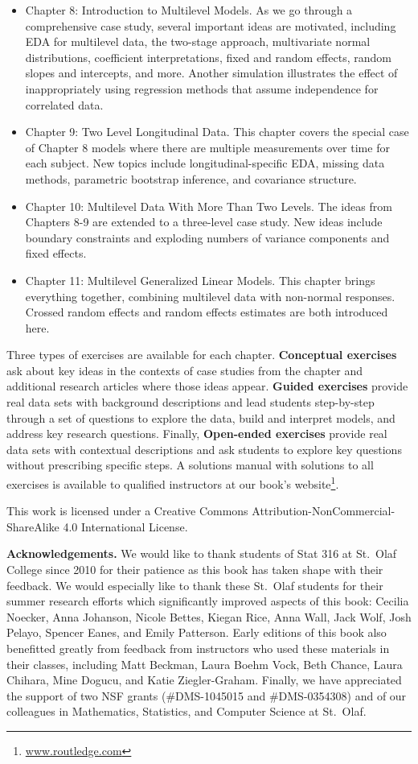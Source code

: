 \documentclass[
]{krantz}
\renewcommand{\href}[2]{#2\footnote{\url{#1}}}
\begin{document}
\begin{itemize}
\item
  Chapter 8: Introduction to Multilevel Models. As we go through a comprehensive case study, several important ideas are motivated, including EDA for multilevel data, the two-stage approach, multivariate normal distributions, coefficient interpretations, fixed and random effects, random slopes and intercepts, and more. Another simulation illustrates the effect of inappropriately using regression methods that assume independence for correlated data.
\item
  Chapter 9: Two Level Longitudinal Data. This chapter covers the special case of Chapter 8 models where there are multiple measurements over time for each subject. New topics include longitudinal-specific EDA, missing data methods, parametric bootstrap inference, and covariance structure.
\item
  Chapter 10: Multilevel Data With More Than Two Levels. The ideas from Chapters 8-9 are extended to a three-level case study. New ideas include boundary constraints and exploding numbers of variance components and fixed effects.
\item
  Chapter 11: Multilevel Generalized Linear Models. This chapter brings everything together, combining multilevel data with non-normal responses. Crossed random effects and random effects estimates are both introduced here.
\end{itemize}

Three types of exercises are available for each chapter. \textbf{Conceptual exercises} ask about key ideas in the contexts of case studies from the chapter and additional research articles where those ideas appear. \textbf{Guided exercises} provide real data sets with background descriptions and lead students step-by-step through a set of questions to explore the data, build and interpret models, and address key research questions. Finally, \textbf{Open-ended exercises} provide real data sets with contextual descriptions and ask students to explore key questions without prescribing specific steps. A solutions manual with solutions to all exercises is available to qualified instructors at our \href{www.routledge.com}{book's website}.

This work is licensed under a Creative Commons Attribution-NonCommercial-ShareAlike 4.0 International License.

\textbf{Acknowledgements.} We would like to thank students of Stat 316 at St.~Olaf College since 2010 for their patience as this book has taken shape with their feedback. We would especially like to thank these St.~Olaf students for their summer research efforts which significantly improved aspects of this book: Cecilia Noecker, Anna Johanson, Nicole Bettes, Kiegan Rice, Anna Wall, Jack Wolf, Josh Pelayo, Spencer Eanes, and Emily Patterson. Early editions of this book also benefitted greatly from feedback from instructors who used these materials in their classes, including Matt Beckman, Laura Boehm Vock, Beth Chance, Laura Chihara, Mine Dogucu, and Katie Ziegler-Graham. Finally, we have appreciated the support of two NSF grants (\#DMS-1045015 and \#DMS-0354308) and of our colleagues in Mathematics, Statistics, and Computer Science at St.~Olaf.
\end{document}
